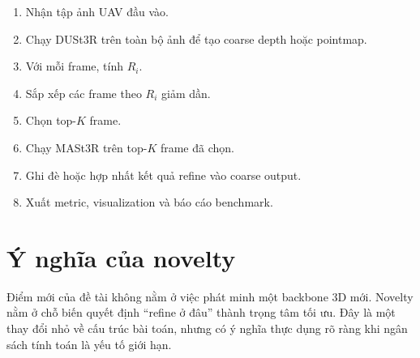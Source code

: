 \documentclass[../DoAn.tex]{subfiles}
\begin{document}
\begin{enumerate}[leftmargin=1.5em]
  \item Nhận tập ảnh UAV đầu vào.
  \item Chạy DUSt3R trên toàn bộ ảnh để tạo coarse depth hoặc pointmap.
  \item Với mỗi frame, tính $R_i$.
  \item Sắp xếp các frame theo $R_i$ giảm dần.
  \item Chọn top-$K$ frame.
  \item Chạy MASt3R trên top-$K$ frame đã chọn.
  \item Ghi đè hoặc hợp nhất kết quả refine vào coarse output.
  \item Xuất metric, visualization và báo cáo benchmark.
\end{enumerate}

\section{Ý nghĩa của novelty}

Điểm mới của đề tài không nằm ở việc phát minh một backbone 3D mới. Novelty nằm ở chỗ biến quyết định ``refine ở đâu'' thành trọng tâm tối ưu. Đây là một thay đổi nhỏ về cấu trúc bài toán, nhưng có ý nghĩa thực dụng rõ ràng khi ngân sách tính toán là yếu tố giới hạn.
\end{document}
